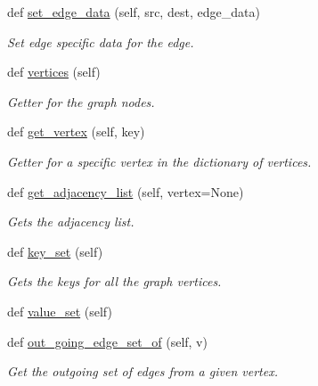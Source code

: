 \begin{DoxyCompactItemize}
def \hyperlink{classbridges_1_1graph__adj__list_1_1_graph_adj_list_aa1b179f2d1ded0135afa792278f3a500}{set\+\_\+edge\+\_\+data} (self, src, dest, edge\+\_\+data)
\begin{DoxyCompactList}\small\item\em Set edge specific data for the edge. \end{DoxyCompactList}\item 
def \hyperlink{classbridges_1_1graph__adj__list_1_1_graph_adj_list_ae41cb9193582a782d4880b18085fc1c6}{vertices} (self)
\begin{DoxyCompactList}\small\item\em Getter for the graph nodes. \end{DoxyCompactList}\item 
def \hyperlink{classbridges_1_1graph__adj__list_1_1_graph_adj_list_af484d881d91177e723faf8b8a5c427e2}{get\+\_\+vertex} (self, key)
\begin{DoxyCompactList}\small\item\em Getter for a specific vertex in the dictionary of vertices. \end{DoxyCompactList}\item 
def \hyperlink{classbridges_1_1graph__adj__list_1_1_graph_adj_list_a523adce952c66505abc5ad14a83ae4c4}{get\+\_\+adjacency\+\_\+list} (self, vertex=None)
\begin{DoxyCompactList}\small\item\em Gets the adjacency list. \end{DoxyCompactList}\item 
def \hyperlink{classbridges_1_1graph__adj__list_1_1_graph_adj_list_a96e264e71acad7474e233a1ec1d1035a}{key\+\_\+set} (self)
\begin{DoxyCompactList}\small\item\em Gets the keys for all the graph vertices. \end{DoxyCompactList}\item 
def \hyperlink{classbridges_1_1graph__adj__list_1_1_graph_adj_list_ae12db7b48cf37ba8d2852fa05ebaa2c0}{value\+\_\+set} (self)
\item 
def \hyperlink{classbridges_1_1graph__adj__list_1_1_graph_adj_list_a6e14580e5fd7712bc8510da921fb97f6}{out\+\_\+going\+\_\+edge\+\_\+set\+\_\+of} (self, v)
\begin{DoxyCompactList}\small\item\em Get the outgoing set of edges from a given vertex. \end{DoxyCompactList}\item 

\end{DoxyCompactItemize}
